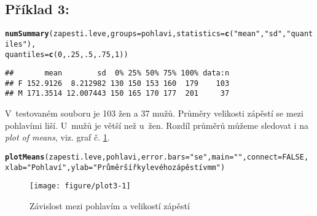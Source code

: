 \documentclass[twoside]{article}\usepackage[]{graphicx}\usepackage[]{color}
\makeatletter
\def\maxwidth{ %
  \ifdim\Gin@nat@width>\linewidth
    \linewidth
  \else
    \Gin@nat@width
  \fi
}
\newcommand{\hlnum}[1]{\textcolor[rgb]{0.686,0.059,0.569}{#1}}%
\newcommand{\hlstr}[1]{\textcolor[rgb]{0.192,0.494,0.8}{#1}}%
\newcommand{\hlstd}[1]{\textcolor[rgb]{0.345,0.345,0.345}{#1}}%
\newcommand{\hlkwc}[1]{\textcolor[rgb]{0.333,0.667,0.333}{#1}}%
\newcommand{\hlkwd}[1]{\textcolor[rgb]{0.737,0.353,0.396}{\textbf{#1}}}%
\newenvironment{kframe}{%
 \def\at@end@of@kframe{}%
 \ifinner\ifhmode%
  \def\at@end@of@kframe{\end{minipage}}%
  \begin{minipage}{\columnwidth}%
 \fi\fi%
 \def\FrameCommand##1{\hskip\@totalleftmargin \hskip-\fboxsep
 \colorbox{shadecolor}{##1}\hskip-\fboxsep
     \hskip-\linewidth \hskip-\@totalleftmargin \hskip\columnwidth}%
 \MakeFramed {\advance\hsize-\width
   \@totalleftmargin\z@ \linewidth\hsize
   \@setminipage}}%
 {\par\unskip\endMakeFramed%
 \at@end@of@kframe}
\newenvironment{knitrout}{}{} %
\makeatother
\begin{document}
\subsection*{Příklad 3:}
\begin{knitrout}
\color{fgcolor}\begin{kframe}
\begin{alltt}
\hlkwd{numSummary}\hlstd{(zapesti.leve,} \hlkwc{groups}\hlstd{=pohlavi,} \hlkwc{statistics}\hlstd{=}\hlkwd{c}\hlstd{(}\hlstr{"mean"}\hlstd{,} \hlstr{"sd"}\hlstd{,} \hlstr{"quantiles"}\hlstd{),}
    \hlkwc{quantiles}\hlstd{=}\hlkwd{c}\hlstd{(}\hlnum{0}\hlstd{,}\hlnum{.25}\hlstd{,}\hlnum{.5}\hlstd{,}\hlnum{.75}\hlstd{,}\hlnum{1}\hlstd{))}
\end{alltt}
\begin{verbatim}
##       mean        sd  0% 25% 50% 75% 100% data:n
## F 152.9126  8.212982 130 150 153 160  179    103
## M 171.3514 12.007443 150 165 170 177  201     37
\end{verbatim}
\end{kframe}
\end{knitrout}
V~testovaném souboru je 103 žen a 37 mužů. Průměry velikosti zápěstí se mezi pohlavími liší. U~mužů je větší než u~žen. Rozdíl průměrů můžeme sledovat i na \emph{plot of means}, viz. graf č. \ref{fig:plot3}.

\begin{knitrout}
\color{fgcolor}\begin{kframe}
\begin{alltt}
\hlkwd{plotMeans}\hlstd{(zapesti.leve, pohlavi,} \hlkwc{error.bars}\hlstd{=}\hlstr{"se"}\hlstd{,} \hlkwc{main}\hlstd{=}\hlstr{""}\hlstd{,} \hlkwc{connect}\hlstd{=}\hlnum{FALSE}\hlstd{,}
    \hlkwc{xlab}\hlstd{=}\hlstr{"Pohlaví"}\hlstd{,} \hlkwc{ylab}\hlstd{=}\hlstr{"Průměr šířky levého zápěstí v mm"}\hlstd{)}
\end{alltt}
\end{kframe}\begin{figure}[h]
\texttt{[image: figure/plot3-1]} \caption[Závislost mezi pohlavím a velikostí zápěstí]{Závislost mezi pohlavím a velikostí zápěstí}\label{fig:plot3}
\end{figure}


\end{knitrout}

\newpage
\end{document}
